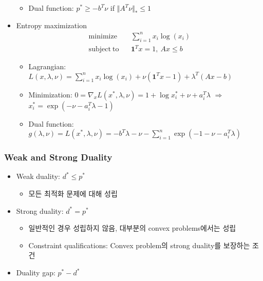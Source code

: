 \begin{itemize}
\begin{itemize}
        \item Dual function: $p^\ast\geq-b^T\nu$ if $\Vert A^T\nu\Vert_\ast\leq 1$
    \end{itemize}
    \item Entropy maximization
        $$ \begin{aligned}
            \mathrm{minimize}~~&~~\sum_{i=1}^n x_i\log(x_i) \\
            \mathrm{subject~to}~~&~~\mathbf{1}^Tx = 1,~Ax\leq b
        \end{aligned} $$
    \begin{itemize}
        \item Lagrangian: $L(x,\lambda,\nu)=\sum_{i=1}^nx_i\log(x_i)+\nu(\mathbf{1}^Tx-1)+\lambda^T(Ax-b)$
        \item Minimization: $0 = \nabla_x L(x^\ast,\lambda,\nu)=1+\log x_i^\ast+\nu+a_i^T\lambda$ $\Rightarrow$ $x_i^\ast=\exp(-\nu-a_i^T\lambda - 1)$
        \item Dual function: $g(\lambda,\nu)=L(x^\ast,\lambda,\nu)=-b^T\lambda-\nu-\sum_{i=1}^n\exp(-1-\nu-a_i^T\lambda)$
    \end{itemize}
\end{itemize}
\newpage

\subsubsection*{Weak and Strong Duality}
\begin{itemize}
    \item Weak duality: $d^\ast\leq p^\ast$
    \begin{itemize}
        \item 모든 최적화 문제에 대해 성립
    \end{itemize}
    \item Strong duality: $d^\ast = p^\ast$
    \begin{itemize}
        \item 일반적인 경우 성립하지 않음, 대부분의 convex problems에서는 성립
        \item Constraint qualifications: Convex problem의 strong duality를 보장하는 조건
    \end{itemize}
    \item Duality gap: $p^\ast - d^\ast$
\end{itemize}

